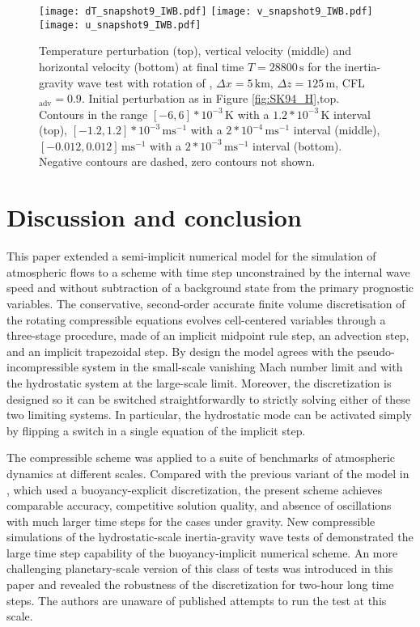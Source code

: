 \documentclass[12pt,a4paper]{article}
\theoremstyle{definition}
\begin{document}
\begin{figure}
\centering
 \texttt{[image: dT\_snapshot9\_IWB.pdf]}
 \texttt{[image: v\_snapshot9\_IWB.pdf]}
 \texttt{[image: u\_snapshot9\_IWB.pdf]}
 \caption{Temperature perturbation (top), vertical velocity (middle) and horizontal velocity (bottom) at final time $T=28800\,\textrm{s}$ for the inertia-gravity wave test with rotation of \cite{BaldaufBrdar2013}, $\Delta x=5\,\textrm{km},\,\Delta z=125\,\textrm{m}$, CFL$_\textrm{adv}=0.9$. Initial perturbation as in Figure \ref{fig:SK94_H},top. Contours in the range $[-6, 6]*10^{-3}\,\textrm{K}$ with a $1.2*10^{-3}\,\textrm{K}$ interval (top), $[-1.2, 1.2]*10^{-3}\,\textrm{ms$^{-1}$}$  with a $2*10^{-4}\,\textrm{ms$^{-1}$}$ interval (middle), $[-0.012, 0.012]\,\textrm{ms$^{-1}$}$ with a $2*10^{-3}\,\textrm{ms$^{-1}$}$ interval (bottom). Negative contours are dashed, zero contours not shown.}
  \label{fig:BB13}
\end{figure}

\section{Discussion and conclusion}
\label{sec:Conclusions}	

This paper extended a semi-implicit numerical model for the simulation of atmospheric flows to a scheme with time step unconstrained by the internal wave speed and without subtraction of a background state from the primary prognostic variables. The conservative, second-order accurate finite volume discretisation of the rotating compressible equations evolves cell-centered variables through a three-stage procedure, made of an implicit midpoint rule step, an advection step, and an implicit trapezoidal step. By design the model agrees with the pseudo-incompressible system in the small-scale vanishing Mach number limit and with the hydrostatic system at the large-scale limit. Moreover, the discretization is designed so it can be switched straightforwardly to strictly solving either of these two limiting systems. In particular, the hydrostatic mode can be activated simply by flipping a switch in a single equation of the implicit step.

The compressible scheme was applied to a suite of benchmarks of atmospheric dynamics at different scales. Compared with the previous variant of the model in \cite{Benacchio2014, BenacchioEtAl2014}, which used a buoyancy-explicit discretization, the present scheme achieves comparable accuracy, competitive solution quality, and absence of oscillations with much larger time steps for the cases under gravity. New compressible simulations of the hydrostatic-scale inertia-gravity wave tests of \cite{SkamarockKlemp1994} demonstrated the large time step capability of the buoyancy-implicit numerical scheme. An more challenging planetary-scale version of this class of tests was introduced in this paper and revealed the robustness of the discretization for two-hour long time steps. The authors are unaware of published attempts to run the test at this scale. 
\end{document}
